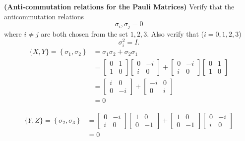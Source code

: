  \textbf{(Anti-commutation relations for the Pauli Matrices)}  Verify that the anticommutation relations $${\sigma_i,\sigma_j}=0$$ where $i\neq j$ are both chosen from the set $1,2,3$.  Also verify that  ($i=0,1,2,3$) $$\sigma_i^2 = I.$$
\Soln
\begin{align*}
\{X, Y\} = \left\{\sigma_1, \sigma_2 \right\} &=\sigma_1 \sigma_2 + \sigma_2 \sigma_1\\
&= \begin{bmatrix}
0 & 1 \\
1 & 0
\end{bmatrix}
\begin{bmatrix}
0 & -i \\
i & 0
\end{bmatrix}
+
\begin{bmatrix}
0 & -i \\
i & 0
\end{bmatrix}
\begin{bmatrix}
0 & 1 \\
1 & 0
\end{bmatrix} \\
%
&=
%
\begin{bmatrix}
i & 0 \\
0 & -i
\end{bmatrix}
+
\begin{bmatrix}
-i & 0 \\
0 & i
\end{bmatrix}\\
%
&= 0
\end{align*}



\begin{align*}
\{Y, Z\}=\left\{\sigma_2, \sigma_3 \right\} &= \begin{bmatrix}
0 & -i \\
i & 0
\end{bmatrix}
\begin{bmatrix}
1 & 0 \\
0 & -1
\end{bmatrix}
+
\begin{bmatrix}
1 & 0 \\
0 & -1
\end{bmatrix}
\begin{bmatrix}
0 & -i \\
i & 0
\end{bmatrix}\\
&=0
\end{align*}



